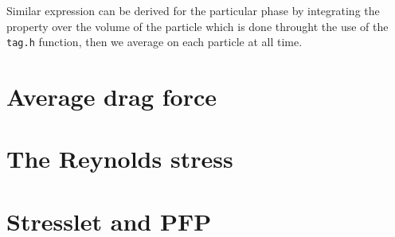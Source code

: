 \documentclass[12pt]{My_preprint}
\begin{document}
Similar expression can be derived for the particular phase by integrating the property over the volume of the particle which is done throught the use of the \texttt{tag.h} function, then we average on each particle at all time.






\section{Average drag force}



\section{The Reynolds stress}





%

\section{Stresslet and PFP}
 
 

\end{document}
